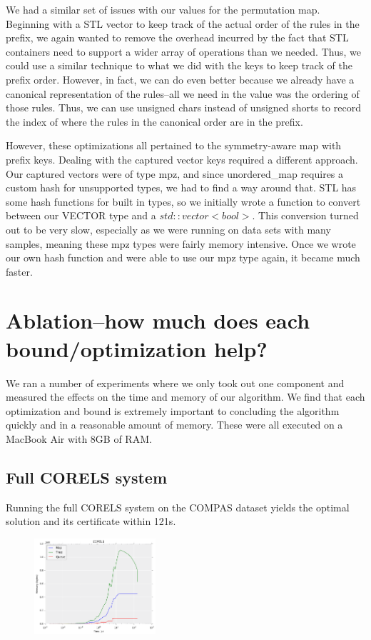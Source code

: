 \documentclass[]{report}
\theoremstyle{definition}
\begin{document}
We had a similar set of issues with our values for the permutation map.
Beginning with a STL vector to keep track of the actual order of the rules in the prefix, we again wanted to remove the overhead incurred by the fact that STL containers need to support a wider array of operations than we needed.
Thus, we could use a similar technique to what we did with the keys to keep track of the prefix order.
However, in fact, we can do even better because we already have a canonical representation of the rules--all we need in the value was the ordering of those rules.
Thus, we can use unsigned chars instead of unsigned shorts to record the index of where the rules in the canonical order are in the prefix.

However, these optimizations all pertained to the symmetry-aware map with prefix keys.
Dealing with the captured vector keys required a different approach.
Our captured vectors were of type mpz, and since unordered\_map requires a custom hash for unsupported types, we had to find a way around that.
STL has some hash functions for built in types, so we initially wrote a function to convert between our VECTOR type and a $std::vector<bool>$.
This conversion turned out to be very slow, especially as we were running on data sets with many samples, meaning these mpz types were fairly memory intensive.
Once we wrote our own hash function and were able to use our mpz type again, it became much faster.

\section{Ablation--how much does each bound/optimization help?}

We ran a number of experiments where we only took out one component and measured the effects on the time and memory of our algorithm.
We find that each optimization and bound is extremely important to concluding the algorithm quickly and in a reasonable amount of memory.
These were all executed on a MacBook Air with 8GB of RAM.

\subsection{Full CORELS system}

Running the full CORELS system on the COMPAS dataset yields the optimal solution and its certificate within 121s.

\begin{figure}[t!]
\begin{center}
\includegraphics[width=0.4\textwidth]{figs/corels_mem.png}
\end{center}
\caption{}
\label{fig:prefix-captured}
\end{figure}
\end{document}
